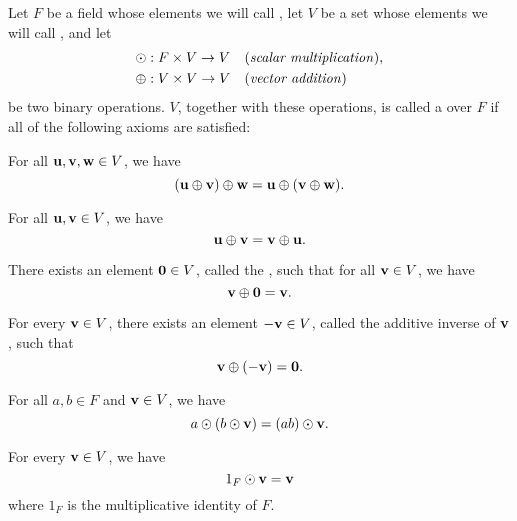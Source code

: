 \begin{definition}
Let $ F $ be a field whose elements we will call , let $ V $ be a set whose elements we will call , and let
\begin{align*}
    & \odot:F\times V\to V && \text{(\emph{scalar multiplication})}, \\
    & \oplus:V\times V\to V && \text{(\emph{vector addition})}
\end{align*}
be two binary operations. $ V $, together with these operations, is called a  over $ F $ if all of the following axioms are satisfied:
\begin{enumerate}
    For all $ \mathbf{u},\mathbf{v},\mathbf{w}\in V $, we have
    \begin{equation*}
        (\mathbf{u}\oplus\mathbf{v})\oplus\mathbf{w}=\mathbf{u}\oplus(\mathbf{v}\oplus\mathbf{w}).
    \end{equation*}

    For all $ \mathbf{u},\mathbf{v}\in V $, we have
    \begin{equation*}
        \mathbf{u}\oplus\mathbf{v}=\mathbf{v}\oplus\mathbf{u}.
    \end{equation*}

    There exists an element $ \mathbf{0}\in V $, called the , such that for all $ \mathbf{v}\in V $, we have
    \begin{equation*}
        \mathbf{v}\oplus\mathbf{0}=\mathbf{v}.
    \end{equation*}

    For every $ \mathbf{v}\in V $, there exists an element $ -\mathbf{v}\in V $\!, called the additive inverse of $ \mathbf{v} $, such that
    \begin{equation*}
        \mathbf{v}\oplus(-\mathbf{v})=\mathbf{0}.
    \end{equation*}

    For all $ a,b\in F $ and $ \mathbf{v}\in V $, we have
    \begin{equation*}
        a\odot (b\odot\mathbf{v})=(ab)\odot\mathbf{v}.
    \end{equation*}

    For every $ \mathbf{v}\in V $, we have
    \begin{equation*}
        1_F\odot\mathbf{v}=\mathbf{v}
    \end{equation*}
    where $ 1_F $ is the multiplicative identity of $ F $.


\end{enumerate}
\end{definition}
